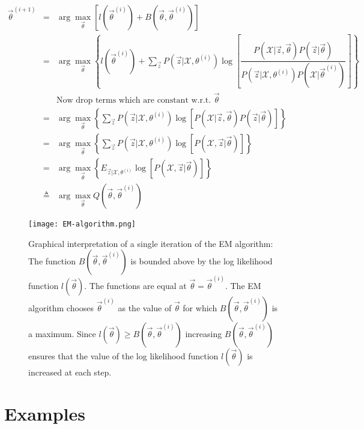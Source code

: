 \begin{eqnarray}
\vec{\theta}^{(i+1)} &=& \arg\max\limits_{\vec{\theta}}{\left[ l(\vec{\theta}^{(i)})+B(\vec{\theta},\vec{\theta}^{(i)})\right]} \nonumber \\
                &=& \arg\max\limits_{\vec{\theta}}{\left\{ l(\vec{\theta}^{(i)})+\sum\limits_{\vec{z}} P(\vec{z}|\mathcal{X},\theta^{(i)})\log\left[\dfrac{P(\mathcal{X}|\vec{z},\vec{\theta})P(\vec{z}|\vec{\theta})}{P(\vec{z}|\mathcal{X},\theta^{(i)})P(\mathcal{X}|\vec{\theta}^{(i)})}\right]\right\}} \nonumber \\
				&& \text{Now drop terms which are constant w.r.t. } \vec{\theta} \nonumber \\
				&=& \arg\max\limits_{\vec{\theta}}{\left\{\sum\limits_{\vec{z}} P(\vec{z}|\mathcal{X},\theta^{(i)})\log\left[P(\mathcal{X}|\vec{z},\vec{\theta})P(\vec{z}|\vec{\theta})\right]\right\}} \nonumber \\
				&=& \arg\max\limits_{\vec{\theta}}{\left\{\sum\limits_{\vec{z}} P(\vec{z}|\mathcal{X},\theta^{(i)})\log\left[P(\mathcal{X},\vec{z}|\vec{\theta})\right]\right\}} \nonumber \\
				&=& \arg\max\limits_{\vec{\theta}}{\left\{E_{\vec{z}|\mathcal{X},\theta^{(i)}}\log\left[P(\mathcal{X},\vec{z}|\vec{\theta})\right]\right\}} \\
				&\triangleq& \arg\max\limits_{\vec{\theta}}{Q(\vec{\theta}, \vec{\theta}^{(i)})}
\end{eqnarray}

\begin{figure}[hbtp]
\centering
    \texttt{[image: EM-algorithm.png]}
\caption{Graphical interpretation of a single iteration of the EM algorithm: The function $B(\vec{\theta},\vec{\theta}^{(i)})$ is bounded above by the log likelihood function $l(\vec{\theta})$. The functions are equal at $\vec{\theta} = \vec{\theta}^{(i)}$. The EM algorithm chooses $\vec{\theta}^{(i)}$ as the value of $\vec{\theta}$ for which $B(\vec{\theta},\vec{\theta}^{(i)})$ is a maximum. Since $l(\vec{\theta}) \geq B(\vec{\theta},\vec{\theta}^{(i)})$ increasing $B(\vec{\theta},\vec{\theta}^{(i)})$ ensures that the value of the log likelihood function $l(\vec{\theta})$ is increased at each step.}
\label{fig:EM-algorithm} 
\end{figure}


\section{Examples}

